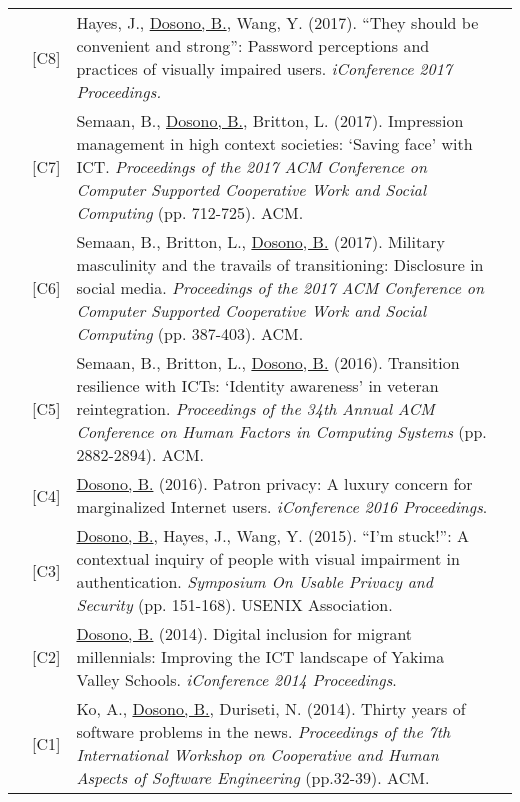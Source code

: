 \documentclass[12pt]{article}
\begin{document}
{{\begin{longtable}{Rp{1.0in}p{0.25in}p{4.75in}}
& \footnotesize{[C8]} & Hayes, J., \href{http://hdl.handle.net/2142/96755}{{Dosono, B.}}, Wang, Y. (2017). ``They should be convenient and strong'': Password perceptions and practices of visually impaired users. \textit{iConference 2017 Proceedings.} \\

& \footnotesize{[C7]} & Semaan, B., \href{http://dl.acm.org/authorize?N41343}{{Dosono, B.}}, Britton, L. (2017). Impression management in high context societies: ‘Saving face’ with ICT. \textit{Proceedings of the 2017 ACM Conference on Computer Supported Cooperative Work and Social Computing} (pp. 712-725). ACM. \\

& \footnotesize{[C6]} & Semaan, B., Britton, L., \href{http://dl.acm.org/authorize?N41344}{{Dosono, B.}} (2017). Military masculinity and the travails of transitioning: Disclosure in social media. \textit{Proceedings of the 2017 ACM Conference on Computer Supported Cooperative Work and Social Computing} (pp. 387-403). ACM. \\

& \footnotesize{[C5]} & Semaan, B., Britton, L., \href{http://dl.acm.org/authorize?N41455}{{Dosono, B.}} (2016). Transition resilience with ICTs: ‘Identity awareness’ in veteran reintegration. \textit{Proceedings of the 34th Annual ACM Conference on Human Factors in Computing Systems} (pp. 2882-2894). ACM. \\

& \footnotesize{[C4]} & \href{http://hdl.handle.net/2142/89438}{{Dosono, B.}} (2016). Patron privacy: A luxury concern for marginalized Internet users.\textit{ iConference 2016 Proceedings}. \\

& \footnotesize{[C3]} & \href{https://www.usenix.org/conference/soups2015/proceedings/presentation/dosono}{{Dosono, B.}}, Hayes, J., Wang, Y. (2015). ``I’m stuck!'': A contextual inquiry of people with visual impairment in authentication. \textit{Symposium On Usable Privacy and Security} (pp. 151-168). USENIX Association. \\

& \footnotesize{[C2]} & \href{http://www.ideals.illinois.edu/handle/2142/47321}{{Dosono, B.}} (2014). Digital inclusion for migrant millennials: Improving the ICT landscape of Yakima Valley Schools. \textit{iConference 2014 Proceedings}. \\

& \footnotesize{[C1]} & Ko, A., \href{http://dl.acm.org/authorize?N41457}{{Dosono, B.}}, Duriseti, N. (2014). Thirty years of software problems in the news. \textit{Proceedings of the 7th International Workshop on Cooperative and Human Aspects of Software Engineering} (pp.32-39). ACM. \\


\end{longtable}}}
\end{document}
